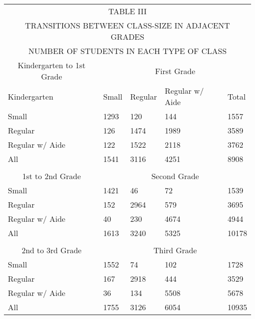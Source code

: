 \begin{tabular}[H]{ |p{2cm}p{2cm}p{2cm}p{2cm}p{2cm}|}
 \hline
 \multicolumn{5}{|c|}{TABLE III} \\
 \multicolumn{5}{|c|}{TRANSITIONS BETWEEN CLASS-SIZE IN ADJACENT GRADES}\\
 \multicolumn{5}{|c|}{ NUMBER OF STUDENTS IN EACH TYPE OF CLASS}\\
 \hline
 \hline
 \multicolumn{1}{|c}{Kindergarten to 1st Grade} 
 &
 \multicolumn{4}{c|}{First Grade} \\
 \hline
   Kindergarten &Small & Regular & Regular w/ Aide& Total \\
Small&  1293&	120	&144&	1557\\
Regular  & 126	&1474&	1989&	3589\\
Regular  w/ Aide& 122&	1522&	2118&	3762\\
All & 1541&	3116&	4251&	8908\\
&&&&\\
 \multicolumn{1}{|c}{1st to 2nd Grade} 
 &
 \multicolumn{4}{c|}{Second Grade} \\
 \hline
 Small& 1421&	46&	72&	1539\\
 Regular&152&	2964&	579	&3695\\
 Regular w/ Aide&40&	230	&4674&	4944\\
 All&1613&	3240&	5325&	10178\\

&&&&\\
 \multicolumn{1}{|c}{2nd to 3rd Grade} 
 &
 \multicolumn{4}{c|}{Third Grade}\\
 \hline
 Small& 1552& 74& 102&	 1728\\
 Regular&167	&2918&	444	&3529\\
 Regular w/ Aide& 36	&134	&5508	&5678\\
 All&1755	&3126&	6054	&10935\\
 \hline

\hline
\end{tabular}


